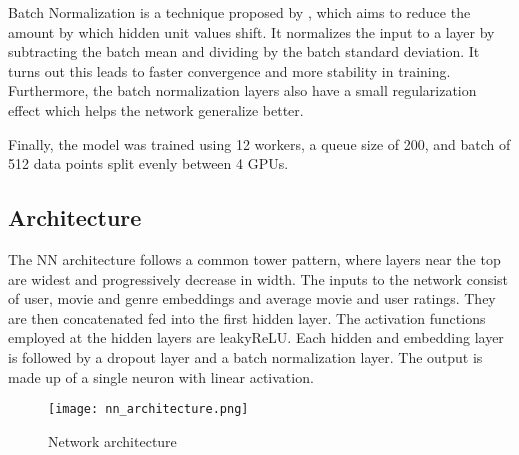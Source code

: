 Batch Normalization is a technique proposed by \citet{batchnorm}, which aims to reduce the amount by which hidden unit values shift. It normalizes the input to a layer by subtracting the batch mean and dividing by the batch standard deviation. It turns out this leads to faster convergence and more stability in training. Furthermore, the batch normalization layers also have a small regularization effect which helps the network generalize better.

Finally, the model was trained using 12 workers, a queue size of 200, and batch of 512 data points split evenly between 4 GPUs.

\subsection{Architecture}
The NN architecture follows a common tower pattern, where layers near the top are widest and progressively decrease in width. The inputs to the network consist of user, movie and genre embeddings and average movie and user ratings. They are then concatenated fed into the first hidden layer.
The activation functions employed at the hidden layers are leakyReLU. Each hidden and embedding layer is followed by a dropout layer and a batch normalization layer. The output is made up of a single neuron with linear activation. 

\begin{figure}[h!]
    \texttt{[image: nn\_architecture.png]}
    \caption{Network architecture}
\end{figure}